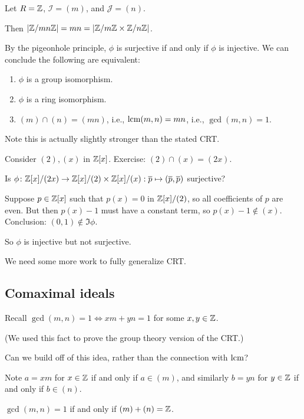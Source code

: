 \documentclass[12pt,letterpaper]{report}
\begin{document}
\begin{ex}
  Let $R = \mathbb{Z}$, $\mathcal{I} = (m)$, and $\mathcal{J} = (n)$.

  Then $\lvert\mathbb{Z}/{mn}\mathbb{Z}\rvert = mn = \lvert\mathbb{Z}/{m}\mathbb{Z} \times \mathbb{Z}/{n}\mathbb{Z}\rvert$.

  By the pigeonhole principle, $\phi$ is surjective if and only if $\phi$ is injective.
  We can conclude the following are equivalent:
  \begin{enumerate}
    \item $\phi$ is a group isomorphism.
    \item $\phi$ is a ring isomorphism.
    \item $(m) \cap (n) = (mn)$, i.e., $\operatorname{lcm}(m, n) = mn$, i.e., $\gcd(m, n) = 1$.
  \end{enumerate}
  Note this is actually slightly stronger than the stated CRT.
\end{ex}

\begin{ex}
  Consider $(2), (x)$ in $\mathbb{Z}[x]$.
  Exercise: $(2) \cap (x) = (2x)$.

  Is $\phi \colon \mathbb{Z}[x]/(2x) \to \mathbb{Z}[x]/(2) \times \mathbb{Z}[x]/(x) :
    \overline{p} \mapsto (\overline{p}, \overline{p})$ surjective?

  Suppose $p \in \mathbb{Z}[x]$ such that $p(x) = 0$ in $\mathbb{Z}[x]/(2)$, so all coefficients of $p$ are even.
  But then $p(x) - 1$ must have a constant term, so $p(x) - 1 \not\in (x)$.
  Conclusion: $(0, 1) \not\in \Im\phi$.

  So $\phi$ is injective but not surjective.
\end{ex}

We need some more work to fully generalize CRT.

\pagebreak
\subsection{Comaximal ideals}

Recall $\gcd(m, n) = 1 \iff xm + yn = 1$ for some $x, y \in \mathbb{Z}$.

(We used this fact to prove the group theory version of the CRT.)

Can we build off of this idea, rather than the connection with $\operatorname{lcm}$?

Note $a = xm$ for $x \in \mathbb{Z}$ if and only if $a \in (m)$, and similarly $b = yn$ for $y \in \mathbb{Z}$ if
and only if $b \in (n)$.

\begin{lem}{}{}
  $\gcd(m, n) = 1$ if and only if $(m) + (n) = \mathbb{Z}$.
\end{lem}
\end{document}
